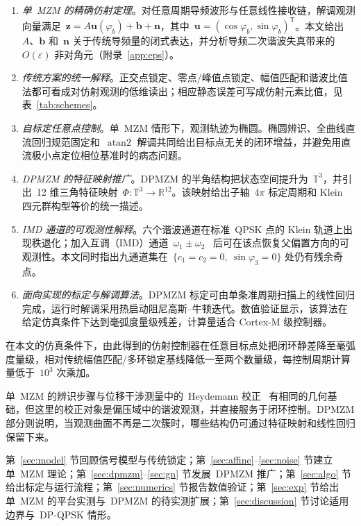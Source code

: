 \documentclass[11pt,journal,onecolumn]{IEEEtran}
\theoremstyle{plain}
\theoremstyle{remark}
\newcommand{\zv}{\mathbf{z}}
\newcommand{\uv}{\mathbf{u}}
\newcommand{\bv}{\mathbf{b}}
\newcommand{\nv}{\mathbf{n}}
\newcommand{\atan}{\operatorname{atan2}}
\newcommand{\T}{\mathsf{T}}
\begin{document}
\begin{enumerate}
\item \emph{单~MZM 的精确仿射定理}。对任意周期导频波形与任意线性接收链，解调观测向量满足~$\zv = A\uv(\varphi_b)+\bv+\nv$，其中~$\uv=(\cos\varphi_b,\sin\varphi_b)^{\T}$。本文给出~$A$、$\bv$ 和~$\nv$ 关于传统导频量的闭式表达，并分析导频二次谐波失真带来的~$O(\varepsilon)$ 非对角元（附录~\ref{app:eps}）。
\item \emph{传统方案的统一解释}。正交点锁定、零点/峰值点锁定、幅值匹配和谐波比值法都可看成对仿射观测的低维读出；相应静态误差可写成仿射元素比值，见表~\ref{tab:schemes}。
\item \emph{自标定任意点控制}。单~MZM 情形下，观测轨迹为椭圆。椭圆辨识、全曲线直流回归规范固定和~$\atan$ 解调共同给出目标点无关的闭环增益，并避免用直流极小点定位相位基准时的病态问题。
\item \emph{DPMZM 的特征映射推广}。DPMZM 的半角结构把状态空间提升为~$\mathbb{T}^3$，并引出~12 维三角特征映射~$\Phi:\mathbb{T}^3\to\mathbb{R}^{12}$。该映射给出子轴~$4\pi$ 标定周期和 Klein 四元群构型等价的统一描述。
\item \emph{IMD 通道的可观测性解释}。六个谐波通道在标准~QPSK 点的 Klein 轨道上出现秩退化；加入互调（IMD）通道~$\omega_1\!\pm\!\omega_2$~\cite{kawakami2012} 后可在该点恢复父偏置方向的可观测性。本文同时指出九通道集在~$\{c_1{=}c_2{=}0,\ \sin\varphi_3{=}0\}$ 处仍有残余奇点。
\item \emph{面向实现的标定与解调算法}。DPMZM 标定可由单条准周期扫描上的线性回归完成，运行时解调采用热启动阻尼高斯--牛顿迭代。数值验证显示，该算法在给定仿真条件下达到毫弧度量级残差，计算量适合 Cortex-M 级控制器。
\end{enumerate}

在本文的仿真条件下，由此得到的仿射控制器在任意目标点处把闭环静差降至毫弧度量级，相对传统幅值匹配/多环锁定基线降低一至两个数量级，每控制周期计算量低于~$10^3$ 次乘加。

单~MZM 的辨识步骤与位移干涉测量中的~Heydemann 校正~\cite{heydemann1981,fitzgibbon1999} 有相同的几何基础，但这里的校正对象是偏压域中的谐波观测，并直接服务于闭环控制。DPMZM 部分则说明，当观测曲面不再是二次簇时，哪些结构仍可通过特征映射和线性回归保留下来。

第~\ref{sec:model} 节回顾信号模型与传统锁定；第~\ref{sec:affine}--\ref{sec:noise} 节建立单~MZM 理论；第~\ref{sec:dpmzm}--\ref{sec:gn} 节发展~DPMZM 推广；第~\ref{sec:algo} 节给出标定与运行流程；第~\ref{sec:numerics} 节报告数值验证；第~\ref{sec:exp} 节给出单~MZM 的平台实测与~DPMZM 的待实测扩展；第~\ref{sec:discussion} 节讨论适用边界与~DP-QPSK 情形。
\end{document}
